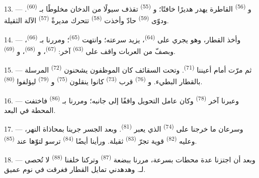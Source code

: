 13. --- و \textsuperscript{(56)} القاطرة يهدر هديرًا خافتًا؛
و \textsuperscript{(55)} تقذف سيولًا من الدخان مخلوطًا
بـ \textsuperscript{(60)}. ودوّى  \textsuperscript{(59)} حادّ
وأخذت  \textsuperscript{(58)} تتحرك مديرةً 
\textsuperscript{(57)} الآلة الثقيلة.

\VUsaut{3.0mm}
\VUsaut{3.0mm}

14. --- وأخذ القطار، وهو يجري على  \textsuperscript{(64)}، يزيد
سرعته؛ وانتهت  \textsuperscript{(65)}؛ ومررنا
بـ \textsuperscript{(66)}، وبصفّ من العربات واقف على
 \textsuperscript{(63)} آخر:  \textsuperscript{(67)}،
و \textsuperscript{(68)}، و \textsuperscript{(69)}.


15. --- ثم مرّت أمام أعيننا  \textsuperscript{(71)}. وتحت
السقائف كان الموظفون يشحنون  \textsuperscript{(72)} المرسلة
بالقطار البطيء. و \textsuperscript{(76)} قرب  \textsuperscript{(73)} كانوا ينقلون  \textsuperscript{(75)}
و \textsuperscript{(79)} ليؤلفوا 
\textsuperscript{(80)}.

16. --- وعبرنا آخر  \textsuperscript{(78)} وكان عامل التحويل واقفًا
إلى جانبه؛ ومررنا بـ \textsuperscript{(86)} فاختفت المحطة في
البعد.

17. --- وسرعان ما خرجنا على  \textsuperscript{(74)} الذي
يعبر  \textsuperscript{(81)}. وبعد الجسر جرينا بمحاذاة النهر، وعليه
 \textsuperscript{(82)} قوية تجرّ  \textsuperscript{(83)}
ثقيلة. ورأينا أيضًا  \textsuperscript{(84)} ترسو لتوّها عند
 \textsuperscript{(85)}.

18. --- وبعد أن اجتزنا عدة محطات بسرعة، مررنا ببضعة 
\textsuperscript{(87)} وتركنا خلفنا  \textsuperscript{(88)} لا تُحصى
لـ. وهدهدني تمايل القطار فغرقت في نوم عميق.

\VUsaut{3.0mm}
\VUsaut{3.0mm}

